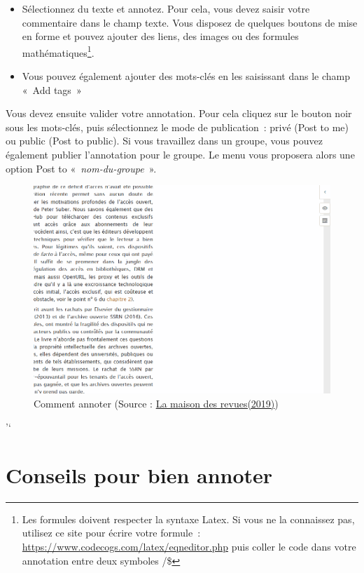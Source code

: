 \documentclass[
]{book}
\providecommand{\tightlist}{%
  \setlength{\itemsep}{0pt}\setlength{\parskip}{0pt}}
\begin{document}
\begin{itemize}
\tightlist
\item
  Sélectionnez du texte et annotez. Pour cela, vous devez saisir votre commentaire dans le champ texte. Vous disposez de quelques boutons de mise en forme et pouvez ajouter des liens, des images ou des formules mathématiques\footnote{Les formules doivent respecter la syntaxe Latex. Si vous ne la connaissez pas, utilisez ce site pour écrire votre formule~: \url{https://www.codecogs.com/latex/eqneditor.php} puis coller le code dans votre annotation entre deux symboles /\$}.
\item
  Vous pouvez également ajouter des mots-clés en les saisissant dans le champ «~Add tags~»
\end{itemize}

Vous devez ensuite valider votre annotation. Pour cela cliquez sur le bouton noir sous les mots-clés, puis sélectionnez le mode de publication~: privé (Post to me) ou public (Post to public). Si vous travaillez dans un groupe, vous pouvez également publier l'annotation pour le groupe. Le menu vous proposera alors une option Post to «~\emph{nom-du-groupe~}».

\begin{figure}
\centering
\includegraphics{img/img-5.png}
\caption{Comment annoter (Source : \href{http://www.maisondesrevues.org/1182}{La maison des revues(2019)})}
\end{figure}

'`

\hypertarget{s31}{%
\section{Conseils pour bien annoter}\label{s31}}
\end{document}
